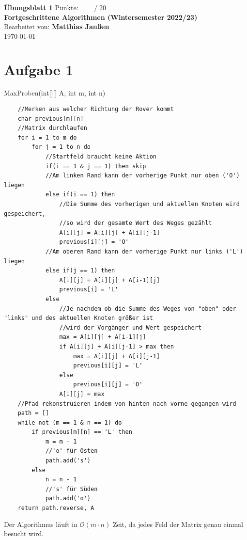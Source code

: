 \documentclass[a4paper]{scrartcl}
\def\Oh{\ensuremath{\mathcal{O}}} %
\def\sheetNumber{1}
\def\names{Matthias Janßen}
\def\sumPoints{20}
\begin{document}
 

\begin{doublespace} %
\noindent \textbf{\LARGE{Übungsblatt \sheetNumber}}
\hfill  {\large Punkte: $\boxed{\qquad  /\; \sumPoints}$}\\
{\Large \textbf{Fortgeschrittene Algorithmen (Wintersemester 2022/23)}\\
Bearbeitet von: \textbf{\names}\\
\today}
\end{doublespace}


\section*{Aufgabe 1}
MaxProben(int[][] A, int m, int n)
\begin{verbatim}
    //Merken aus welcher Richtung der Rover kommt
    char previous[m][n]
    //Matrix durchlaufen
    for i = 1 to m do
        for j = 1 to n do
            //Startfeld braucht keine Aktion
            if(i == 1 & j == 1) then skip
            //Am linken Rand kann der vorherige Punkt nur oben ('O') liegen
            else if(i == 1) then
                //Die Summe des vorherigen und aktuellen Knoten wird gespeichert, 
                //so wird der gesamte Wert des Weges gezählt
                A[i][j] = A[i][j] + A[i][j-1]
                previous[i][j] = 'O'
            //Am oberen Rand kann der vorherige Punkt nur links ('L') liegen
            else if(j == 1) then
                A[i][j] = A[i][j] + A[i-1][j]
                previous[i] = 'L'
            else
                //Je nachdem ob die Summe des Weges von "oben" oder "links" und des aktuellen Knoten größer ist
                //wird der Vorgänger und Wert gespeichert
                max = A[i][j] + A[i-1][j]
                if A[i][j] + A[i][j-1] > max then
                    max = A[i][j] + A[i][j-1]
                    previous[i][j] = 'L'
                else
                    previous[i][j] = 'O'
                A[i][j] = max
    //Pfad rekonstruieren indem von hinten nach vorne gegangen wird
    path = []
    while not (m == 1 & n == 1) do
        if previous[m][n] == 'L' then
            m = m - 1
            //'o' für Osten
            path.add('s')
        else
            n = n - 1
            //'s' für Süden
            path.add('o')
    return path.reverse, A

\end{verbatim}

Der Algorithmus läuft in $\Oh(m \cdot n)$ Zeit, da jedes Feld der Matrix genau einmal besucht wird.\bigskip\newline
\end{document}
